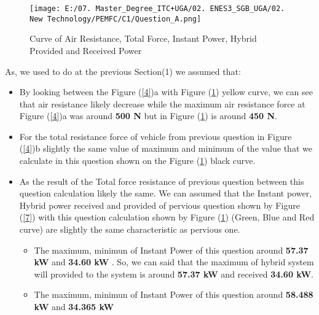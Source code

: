 \documentclass[12pt,a4paper]{article}
\numberwithin{equation}{section}
\begin{document}
\begin{figure}[h]
	\centering 
	\texttt{[image: E:/07. Master\_Degree\_ITC+UGA/02. ENES3\_SGB\_UGA/02. New Technology/PEMFC/C1/Question\_A.png]}
	\caption{\small {Curve of Air Resistance, Total Force, Instant Power, Hybrid Provided and Received Power}}
	\label{19}
\end{figure}
As, we used to do at the previous Section(1) we assumed that:
\begin{itemize}
	\item By looking between the Figure (\ref{4})a with Figure (\ref{19}) yellow curve, we can see that air resistance likely decrease while the maximum air resistance force at Figure (\ref{4})a was around \textbf{500 N} but in Figure (\ref{19}) is around \textbf{450 N}.
	\item For the total resistance force of vehicle from previous question in Figure (\ref{4})b slightly the same value of maximum and minimum of the value that we calculate in this question shown on the Figure (\ref{19}) black curve. 
	\item As the result of the Total force resistance of previous question between this question calculation likely the same. We can assumed that the Instant power, Hybrid power received and provided of pervious question shown by Figure (\ref{7}) with this question calculation shown by Figure (\ref{19}) (Green, Blue and Red curve) are slightly the same characteristic as pervious one.
	\begin{itemize}
		\item The maximum, minimun of Instant Power of this question around \textbf{57.37 kW} and \textbf{34.60 kW} . So, we can said that the maximum of hybrid system will provided to the system is around \textbf{57.37 kW} and received \textbf{34.60 kW}.
		\item The maximum, minimun of Instant Power of this question around \textbf{58.488 kW} and \textbf{34.365 kW}
	\end{itemize}
\end{itemize}
\end{document}
